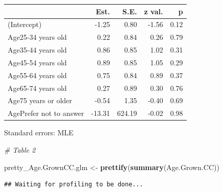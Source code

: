 \documentclass[12pt,]{article}
\newenvironment{Shaded}{\begin{snugshade}}{\end{snugshade}}
\newcommand{\KeywordTok}[1]{\textcolor[rgb]{0.13,0.29,0.53}{\textbf{#1}}}
\newcommand{\DataTypeTok}[1]{\textcolor[rgb]{0.13,0.29,0.53}{#1}}
\newcommand{\DecValTok}[1]{\textcolor[rgb]{0.00,0.00,0.81}{#1}}
\newcommand{\StringTok}[1]{\textcolor[rgb]{0.31,0.60,0.02}{#1}}
\newcommand{\CommentTok}[1]{\textcolor[rgb]{0.56,0.35,0.01}{\textit{#1}}}
\newcommand{\OtherTok}[1]{\textcolor[rgb]{0.56,0.35,0.01}{#1}}
\newcommand{\OperatorTok}[1]{\textcolor[rgb]{0.81,0.36,0.00}{\textbf{#1}}}
\newcommand{\NormalTok}[1]{#1}
\begin{document}
\begin{table}[!h]
\centering
\begin{threeparttable}
\begin{tabular}{lrrrr}
\toprule
  & Est. & S.E. & z val. & p\\
\midrule
\rowcolor{gray!6}  (Intercept) & -1.25 & 0.80 & -1.56 & 0.12\\
Age25-34 years old & 0.22 & 0.84 & 0.26 & 0.79\\
\rowcolor{gray!6}  Age35-44 years old & 0.86 & 0.85 & 1.02 & 0.31\\
Age45-54 years old & 0.89 & 0.85 & 1.05 & 0.29\\
\rowcolor{gray!6}  Age55-64 years old & 0.75 & 0.84 & 0.89 & 0.37\\
\addlinespace
Age65-74 years old & 0.27 & 0.89 & 0.30 & 0.76\\
\rowcolor{gray!6}  Age75 years or older & -0.54 & 1.35 & -0.40 & 0.69\\
AgePrefer not to answer & -13.31 & 624.19 & -0.02 & 0.98\\
\bottomrule
\end{tabular}
\begin{tablenotes}
\item Standard errors: MLE
\end{tablenotes}
\end{threeparttable}
\end{table}

\begin{Shaded}
\begin{Highlighting}[]
\CommentTok{# Table 2}

\NormalTok{pretty_Age.GrownCC.glm <-}\StringTok{ }\KeywordTok{prettify}\NormalTok{(}\KeywordTok{summary}\NormalTok{(Age.Grown.CC))}
\end{Highlighting}
\end{Shaded}

\begin{verbatim}
## Waiting for profiling to be done...
\end{verbatim}

\begin{Shaded}
\end{Shaded}
\end{document}
